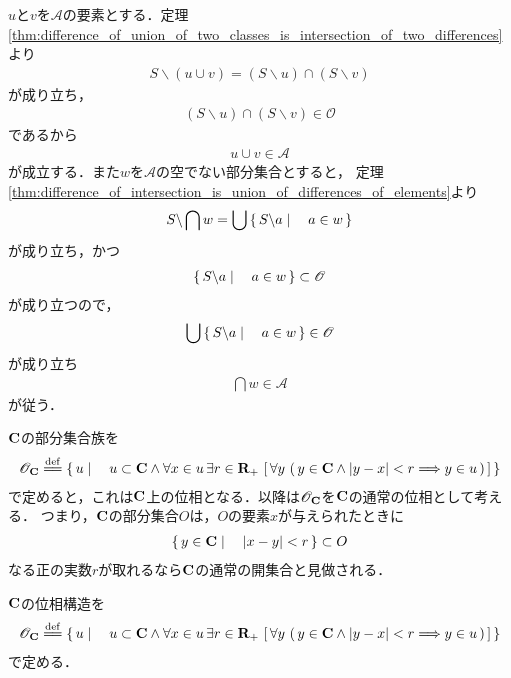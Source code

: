 	\begin{sketch}
		$u$と$v$を$\mathscr{A}$の要素とする．定理\ref{thm:difference_of_union_of_two_classes_is_intersection_of_two_differences}より
		\begin{align}
			S \backslash (u \cup v) = (S \backslash u) \cap (S \backslash v)
		\end{align}
		が成り立ち，
		\begin{align}
			(S \backslash u) \cap (S \backslash v) \in \mathscr{O}
		\end{align}
		であるから
		\begin{align}
			u \cup v \in \mathscr{A}
		\end{align}
		が成立する．また$w$を$\mathscr{A}$の空でない部分集合とすると，
		定理\ref{thm:difference_of_intersection_is_union_of_differences_of_elements}より
		\begin{align}
			S \backslash \bigcap w = \bigcup \left\{\, S \backslash a \mid \quad a \in w\, \right\}
		\end{align}
		が成り立ち，かつ
		\begin{align}
			\left\{\, S \backslash a \mid \quad a \in w\, \right\} \subset \mathscr{O}
		\end{align}
		が成り立つので，
		\begin{align}
			\bigcup \left\{\, S \backslash a \mid \quad a \in w\, \right\} \in \mathscr{O}
		\end{align}
		が成り立ち
		\begin{align}
			\bigcap w \in \mathscr{A}
		\end{align}
		が従う．
		\QED
	\end{sketch}
	
	$\C$の部分集合族を
	\begin{align}
		\mathscr{O}_\C \defeq \Set{u}{u \subset \C \wedge \forall x \in u\, \exists r \in \R_+\, 
				\left[\, \forall y\, \left(\, y \in \C \wedge |y-x| < r \Longrightarrow y \in u\, \right)\, \right]}
	\end{align}
	で定めると，これは$\C$上の位相となる．以降は$\mathscr{O}_{\mathbf{C}}$を$\C$の通常の位相として考える．
	つまり，$\C$の部分集合$O$は，$O$の要素$x$が与えられたときに
	\begin{align}
		\left\{\, y \in \mathbf{C} \mid \quad |x-y| < r\, \right\} \subset O
	\end{align}
	なる正の実数$r$が取れるなら$\C$の通常の開集合と見做される．
	
	\begin{screen}
		\begin{dfn}[$\C$の位相]
			$\C$の位相構造を
			\begin{align}
				\mathscr{O}_\C \defeq \Set{u}{u \subset \C \wedge \forall x \in u\, \exists r \in \R_+\, 
				\left[\, \forall y\, \left(\, y \in \C \wedge |y-x| < r \Longrightarrow y \in u\, \right)\, \right]}
			\end{align}
			で定める．
		\end{dfn}
	\end{screen}
	
